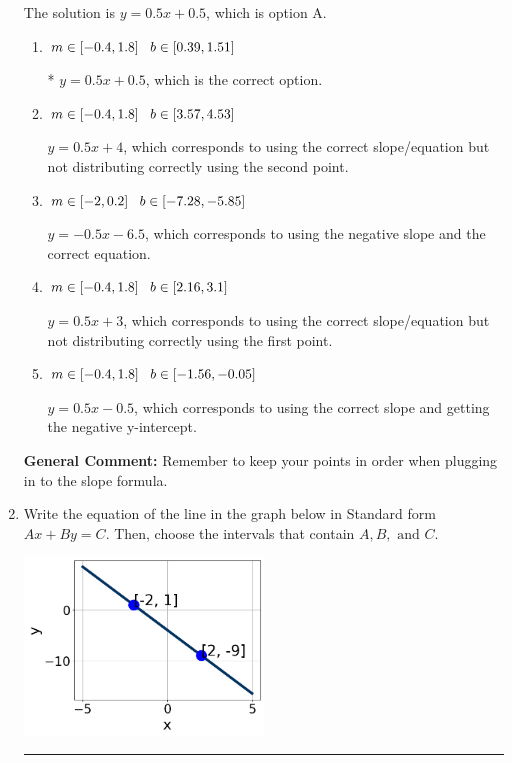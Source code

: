 \documentclass{extbook}[14pt]
\newcommand{\litem}[1]{\item #1

\rule{\textwidth}{0.4pt}}
\begin{document}
\begin{enumerate}
{The solution is \( y = 0.5x + 0.5 \), which is option A.\begin{enumerate}[label=\Alph*.]
\item \( m \in [-0.4, 1.8] \hspace*{3mm} b \in [0.39, 1.51] \)

* $y = 0.5x + 0.5$, which is the correct option.
\item \( m \in [-0.4, 1.8] \hspace*{3mm} b \in [3.57, 4.53] \)

 $y = 0.5x + 4$, which corresponds to using the correct slope/equation but not distributing correctly using the second point.
\item \( m \in [-2, 0.2] \hspace*{3mm} b \in [-7.28, -5.85] \)

 $y = -0.5x -6.5$, which corresponds to using the negative slope and the correct equation.
\item \( m \in [-0.4, 1.8] \hspace*{3mm} b \in [2.16, 3.1] \)

 $y = 0.5x + 3$, which corresponds to using the correct slope/equation but not distributing correctly using the first point.
\item \( m \in [-0.4, 1.8] \hspace*{3mm} b \in [-1.56, -0.05] \)

 $y = 0.5x -0.5$, which corresponds to using the correct slope and getting the negative y-intercept.
\end{enumerate}

\textbf{General Comment:} Remember to keep your points in order when plugging in to the slope formula.
}
\litem{
Write the equation of the line in the graph below in Standard form $Ax+By=C$. Then, choose the intervals that contain $A, B, \text{ and } C$.

\begin{center}
    \includegraphics[width=0.5\textwidth]{../Figures/linearGraphToStandardA.png}
\end{center}




}
\end{enumerate}
\end{document}
